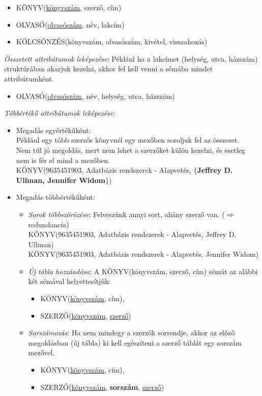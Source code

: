 \documentclass[tikz,12pt,margin=0px]{article}
\begin{document}
    \begin{itemize}
      \item KÖNYV(\underline{könyvszám}, szerző, cím)
      \item OLVASÓ(\underline{olvasószám}, név, lakcím)
      \item KÖLCSÖNZÉS(könyvszám, olvasószám, kivétel, visszahozás)
    \end{itemize}

    \noindent \textit{Összetett attribútumok leképezése}: Például ha a lakcímet (helység, utca, házszám) struktúrában akarjuk kezelni, akkor fel kell venni a sémába mindet attribútumként.
    \begin{itemize}
      \item OLVASÓ(\underline{olvasószám}, név, helység, utca, házszám)
    \end{itemize}

	\noindent \textit{Többértékű attribútumok leképezése}:
	\begin{itemize}
        \item Megadás egyértékűként: \\
        Például egy több szerzős könyvnél egy mezőben soroljuk fel az összeset.\\
        Nem túl jó megoldás, mert nem lehet a szerzőket külön kezelni, és esetleg nem is fér el mind a mezőben.\\
        {\small
        KÖNYV(9635451903, Adatbázis rendszerek - Alapvetés, $\boldsymbol{\{}$\textbf{Jeffrey D. Ullman, Jennifer Widom}$\boldsymbol{\}}$)
        }
		\item Megadás többértékűként:
		\begin{itemize}
			\item \emph{Sorok többszörözése}: Felveszünk annyi sort, ahány szerző van. ($\Rightarrow$ redundancia)\\
            {\small
            KÖNYV(9635451903, Adatbázis rendszerek - Alapvetés, Jeffrey D. Ullman)\\
            KÖNYV(9635451903, Adatbázis rendszerek - Alapvetés, Jennifer Widom)
            }
        \item \emph{Új tábla hozzáadása}: A {\small KÖNYV(könyvszám, szerző, cím)} sémát az alábbi két sémával helyettesítjük:
        \begin{itemize}
            \small
            \item KÖNYV(\underline{könyvszám}, cím),
            \item SZERZŐ(\underline{könyvszám}, \underline{szerző})
        \end{itemize}
		\item \emph{Sorszámozás}: Ha nem mindegy a szerzők sorrendje, akkor az előző megoldásban (új tábla) ki kell egészíteni a szerző táblát egy sorszám mezővel.
        \begin{itemize}
            \small
            \item KÖNYV(\underline{könyvszám}, cím),
            \item SZERZŐ(\underline{könyvszám}, \textbf{sorszám}, \underline{szerző})
        \end{itemize}
		\end{itemize}
	\end{itemize}
\end{document}
